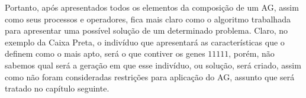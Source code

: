 Portanto, após apresentados todos os elementos da composição de um AG, assim como seus processos e operadores, fica mais claro como o algoritmo trabalhada para apresentar uma possível solução de um determinado problema. Claro, no exemplo da Caixa Preta, o indivíduo que apresentará as características que o definem como o mais apto, será o que contiver os genes $11111$, porém, não sabemos qual será a geração em que esse indivíduo, ou solução, será criado, assim como não foram consideradas restrições para aplicação do AG, assunto que será tratado no capítulo seguinte.
